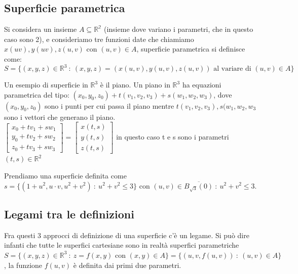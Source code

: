 \subsection{Superficie parametrica}
Si considera un insieme $A \subseteq \mathbb{R^2}$ (insieme dove variano i parametri, che in questo caso sono 2), e consideriamo tre funzioni date che chiamiamo $x(uv), y(uv), z(u,v)$ con $(u,v) \in A$, superficie parametrica si definisce come:
\[S = \{(x,y,z) \in \mathbb{R}^3 \::\: (x,y,z) = (x(u,v), y(u,v), z(u,v)) \text{ al variare di }(u,v) \in A\}\]

\begin{example}
Un esempio di superficie in $\mathbb{R}^3$ è il piano. Un piano in $\mathbb{R}^3$ ha equazioni parametrica del tipo: $(x_0,y_0,z_0) + t(v_1,v_2,v_3) + s(w_1, w_2, w_3)$, dove $(x_0,y_0,z_0)$ sono i punti per cui passa il piano mentre $t(v_1,v_2,v_3), s(w_1, w_2, w_3$ sono i vettori che generano il piano.\\
$\begin{bmatrix}x_0 + tv_1 + sw_1\\ y_0 + tv_2 + sw_2\\ z_0 + tv_3 + sw_3\end{bmatrix} = \begin{bmatrix}x(t,s)\\y(t,s)\\z(t,s)\end{bmatrix}$ in questo caso t e s sono i parametri $(t,s) \in \mathbb{R}^2$
\end{example}

\begin{example}
Prendiamo una superficie definita come $s = \{(1 + u^2, u \cdot v, u^2 + v^2) \::\: u^2 + v^2 \leq 3\}$ con $(u,v) \in \overline{B_{\sqrt{3}}(0)} \::\: u^2 + v^2 \leq 3$.
\end{example}

\subsection{Legami tra le definizioni}
Fra questi 3 approcci di definizione di una superficie c'è un legame. Si può dire infanti che tutte le superfici cartesiane sono in realtà superfici parametriche $S = \{(x,y,z) \in \mathbb{R}^3 \::\: z = f(x,y) \text{ con }(x,y) \in A\} = \{(u,v, f(u,v)) \::\: (u,v) \in A\}$, la funzione $f(u,v)$ è definita dai primi due parametri.

